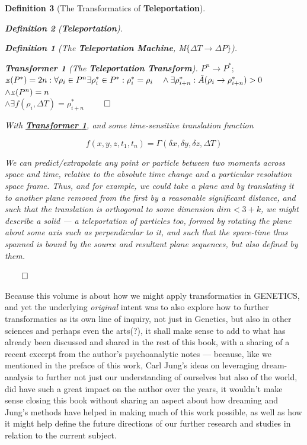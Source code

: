 \documentclass[a4paper, 18pt]{book} %
\newtheorem{defn}{Definition}
\newtheorem{transf}{Transformer}
\newcommand{\invpi}{\rotatebox[origin=c]{180}{$\pi$}}
\begin{document}
\begin{appendices}
\begin{defn}[The Transformatics of \textbf{Teleportation}]
\begin{defn}[\textbf{Teleportation}]
\begin{defn}[The \textbf{Teleportation Machine}, M$\{\Delta T \rightarrow \Delta P\}$]
\begin{transf}[The \textbf{Teleportation Transform}]
\label{TRANSFTELEP}
$P^{n} \rightarrow P^* ;$\\
$\invpi(P^*) = 2n : \forall \rho_i \in P^n \exists \rho^*_i \in P^* : \rho^*_i = \rho_i \quad \land \exists \rho^*_{i+n} : \tilde{A}(\rho_i \rightarrow \rho^*_{i+n}) > 0$\\
$\land \invpi(P^n) = n$\\
$\land \exists f(\rho_i,\Delta T) = \rho^*_{i+n}$
$\qed$
\end{transf}
\end{defn}

\end{defn}

With \textbf{\hyperref[TRANSFTELEP]{Transformer \ref{TRANSFTELEP}}}, and some time-sensitive translation function 

\begin{equation}
f({x,y,z,t_1,t_n}) = \Gamma(\delta x,\delta y,\delta z,\Delta T)
\end{equation}

We can predict/extrapolate any point or particle between two moments across space and time, relative to the absolute time change and a particular resolution space frame. Thus, and for example, we could take a plane and by translating it to another plane removed from the first by a reasonable significant distance, and such that the translation is orthogonal to some dimension $dim < 3 + k$, we might describe a solid --- a teleportation of particles too, formed by rotating the plane about some axis such as perpendicular to it, and such that the space-time thus spanned is bound by the source and resultant plane sequences, but also defined by them.

$\qed$
\end{defn}


Because this volume is about how we might apply transformatics in GENETICS, and yet the underlying \textit{original} intent was to also explore how to further transformatics as its own line of inquiry, not just in Genetics, but also in other sciences and perhaps even the arts(?), it shall make sense to add to what has already been discussed and shared in the rest of this book, with a sharing of a recent excerpt from the author's psychoanalytic notes --- because, like we mentioned in the preface of this work, Carl Jung's ideas\cite{jung1964symbols} on leveraging dream-analysis to further not just our understanding of ourselves but also of the world, did have such a great impact on the author over the years, it wouldn't make sense closing this book without sharing an aspect about how dreaming and Jung's methods have helped in making much of this work possible, as well as how it might help define the future directions of our further research and studies in relation to the current subject. 


\end{appendices}
\end{document}
